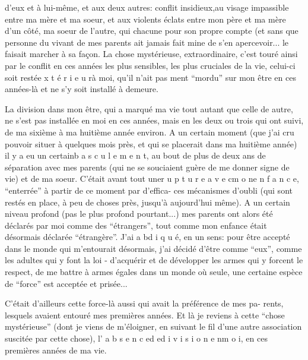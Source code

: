 d'eux et à lui-même, et aux deux autres: conflit insidieux,au visage impassible
entre ma mère et ma soeur, et  aux violents éclats entre mon père et ma
mère d'un côté, ma soeur de l'autre, qui chacune pour son propre compte (et sans
que personne du vivant de mes parents ait jamais fait mine de s'en apercevoir...
le faisait marcher à sa façon. La chose mystérieuse, extraordinaire, c'est \newline
touré ainsi par le conflit en ces années les plus sensibles, les plus cruciales
de la vie, celui-ci soit resté\quad e x t é r i e u r\quad à moi, qu'il n'ait pas \newline
ment ``mordu'' sur mon être en ces années-là et ne s'y soit installé à demeure.

La division dans mon être, qui a marqué ma vie tout autant que celle de 
autre, ne s'est pas installée en moi en ces années, mais en les deux ou trois 
qui ont suivi, de ma sixième à ma huitième année environ. A un certain moment
(que j'ai cru pouvoir situer à quelques mois près, et qui se placerait dans ma
huitième année) il y a eu un certain\quad b a s c u l e m e n t\quad, au bout de plus
de deux ans de séparation avec mes parents (qui ne se souciaient guère de me
donner signe de vie) et de ma soeur. C'était avant tout une\quad r u p t u r e\quad
a v e c\quad m o n\quad e n f a n c e\quad, ``enterrée'' à partir de ce moment par d'effica-\newline
ces mécanismes d'oubli (qui sont restés en place, à peu de choses près, jusqu'à
aujourd'hui même). A un certain niveau profond (pas le plus profond pourtant...)
mes parents ont alors été déclarés par moi comme des ``étrangers'', tout comme mon
enfance était désormais déclarée ``étrangère''. J'ai a bd i q u é\quad, en un sens:
pour être accepté dans le monde qui m'entourait désormais, j'ai décidé d'être
comme ``eux'', comme les adultes qui y font la loi - d'acquérir et de développer
les armes qui y forcent le respect, de me battre à armes égales dans un monde où
seule, une certaine espèce de ``force'' est acceptée et prisée...

C'était d'ailleurs cette force-là aussi qui avait la préférence de mes pa-\newline
rents, lesquels avaient entouré mes premières années. Et là je reviens à cette
``chose mystérieuse'' (dont je viens de m'éloigner, en suivant le fil d'une autre
association suscitée par cette chose), l' a b s e n c e\quad d e\quad d i v i s i o n\quad
e n\quad m o i\quad, en ces premières années de ma vie.

